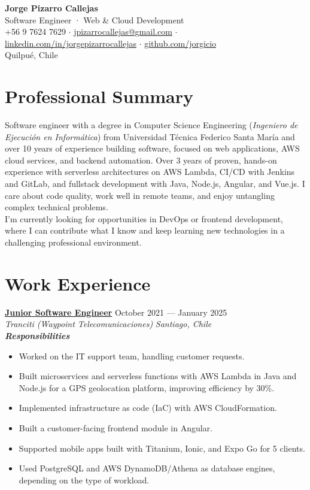\documentclass[11pt,a4paper]{article}
\newcommand{\job}[4]{%
    \textbf{\underline{#1}} \hfill #2\\
    \textit{#3} \hfill \textit{#4}\\[2pt]
}
\newcommand{\newsubsection}[1]{
    \vspace{0em}
    \textbf{\textit{#1}}
    \vspace{0em}
}
\begin{document}
\begin{center}
    {\Huge \textbf{Jorge Pizarro Callejas}}\\[4pt]
    {\large Software Engineer · Web \& Cloud Development}\\[6pt]
    +56 9 7624 7629 \; $\cdot$ \; \href{mailto:jpizarrocallejas@gmail.com}{jpizarrocallejas@gmail.com} \; $\cdot$ \;
    \href{https://linkedin.com/in/jorgepizarrocallejas}{linkedin.com/in/jorgepizarrocallejas} \; $\cdot$ \;
    \href{https://github.com/jorgicio}{github.com/jorgicio}\\[2pt]
    Quilpué, Chile
\end{center}


\section*{Professional Summary}
Software engineer with a degree in Computer Science Engineering (\textit{Ingeniero de Ejecución en Informática}) from Universidad Técnica Federico Santa María and over 10 years of experience building software, focused on web applications, AWS cloud services, and backend automation. Over 3 years of proven, hands-on experience with serverless architectures on AWS Lambda, CI/CD with Jenkins and GitLab, and fullstack development with Java, Node.js, Angular, and Vue.js. I care about code quality, work well in remote teams, and enjoy untangling complex technical problems.\\
I'm currently looking for opportunities in DevOps or frontend development, where I can contribute what I know and keep learning new technologies in a challenging professional environment.


\section*{Work Experience}

\job{Junior Software Engineer}{October 2021 --- January 2025}{Tranciti (Waypoint Telecomunicaciones)}{Santiago, Chile}

\newsubsection{Responsibilities}
\begin{itemize}[leftmargin=*, noitemsep, topsep=2pt]
    \item Worked on the IT support team, handling customer requests. 
    \item Built microservices and serverless functions with AWS Lambda in Java and Node.js for a GPS geolocation platform, improving efficiency by 30\%.
    \item Implemented infrastructure as code (IaC) with AWS CloudFormation.
    \item Built a customer-facing frontend module in Angular.
    \item Supported mobile apps built with Titanium, Ionic, and Expo Go for 5 clients.
    \item Used PostgreSQL and AWS DynamoDB/Athena as database engines, depending on the type of workload.
\end{itemize}
\end{document}
